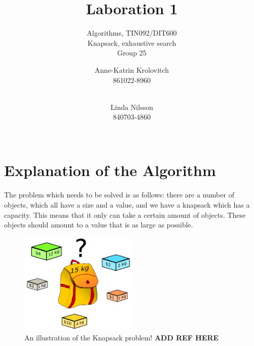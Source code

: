 \documentclass{inc/mas}
\title{Laboration 1 }
\subtitle{Algorithms, TIN092/DIT600\\ Knapsack, exhaustive search \\ Group 25}
\affiliation{}
\begin{document}
\author{Anne-Katrin Krolovitch \\ 861022-8960\\ \\ \and
Linda Nilsson \\ 840703-4860 \\ \\ \tabularnewline
}
\maketitle
\section{Explanation of the Algorithm} 
 \noindent The problem which needs to be solved is as follows: there are a number of objects, which all have a size and a value, and we have a knapsack which has a capacity. This means that it only can take a certain amount of objects. These objects should amount to a value that is as large as possible.\\

\begin{figure}[h!]
  \centering
      \includegraphics[width=0.5\textwidth]{Knapsack.png}
  \caption{An illustration of the Knapsack problem! \textbf{ADD REF HERE} }
\end{figure}


\end{document}
